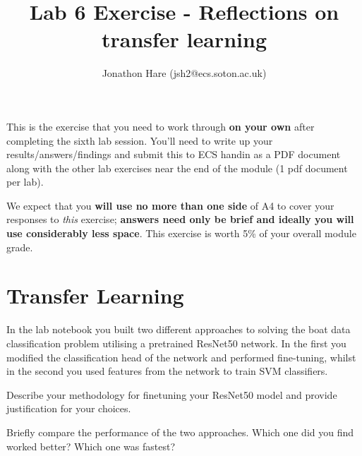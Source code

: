 \documentclass[a4paper]{article}
\begin{document}
\lstset{language=Python,upquote=true}

\setlength{\leftskip}{20pt}
\title{Lab 6 Exercise - Reflections on transfer learning}
\author{Jonathon Hare (jsh2@ecs.soton.ac.uk)}

\maketitle


This is the exercise that you need to work through \textbf{on your own} after completing the sixth lab session. You'll need to write up your results/answers/findings and submit this to ECS handin as a PDF document along with the other lab exercises near the end of the module (1 pdf document per lab). 

We expect that you \textbf{will use no more than one side} of A4 to cover your responses to \emph{this} exercise; \textbf{answers need only be brief and ideally you will use considerably less space}. This exercise is worth 5\% of your overall module grade.

\section{Transfer Learning}
In the lab notebook you built two different approaches to solving the boat data classification problem utilising a pretrained ResNet50 network. In the first you modified the classification head of the network and performed fine-tuning, whilst in the second you used features from the network to train SVM classifiers.
\\[1em]
\begin{tcolorbox}[title=Finetuning (2 marks)]
Describe your methodology for finetuning your ResNet50 model and provide justification for your choices.
\end{tcolorbox}
\vspace{1em}
\begin{tcolorbox}[title=Reflect on the two different approaches (3 marks)]
Briefly compare the performance of the two approaches. Which one did you find worked better? Which one was fastest? 
\end{tcolorbox}
\end{document}
